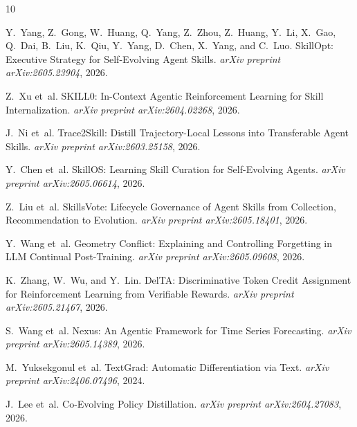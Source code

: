 \documentclass[11pt,a4paper]{article}
\begin{document}

\begin{thebibliography}{10}

Y.~Yang, Z.~Gong, W.~Huang, Q.~Yang, Z.~Zhou, Z.~Huang, Y.~Li, X.~Gao, Q.~Dai, B.~Liu, K.~Qiu, Y.~Yang, D.~Chen, X.~Yang, and C.~Luo.
\newblock SkillOpt: Executive Strategy for Self-Evolving Agent Skills.
\newblock \emph{arXiv preprint arXiv:2605.23904}, 2026.

Z.~Xu et~al.
\newblock SKILL0: In-Context Agentic Reinforcement Learning for Skill Internalization.
\newblock \emph{arXiv preprint arXiv:2604.02268}, 2026.

J.~Ni et~al.
\newblock Trace2Skill: Distill Trajectory-Local Lessons into Transferable Agent Skills.
\newblock \emph{arXiv preprint arXiv:2603.25158}, 2026.

Y.~Chen et~al.
\newblock SkillOS: Learning Skill Curation for Self-Evolving Agents.
\newblock \emph{arXiv preprint arXiv:2605.06614}, 2026.

Z.~Liu et~al.
\newblock SkillsVote: Lifecycle Governance of Agent Skills from Collection, Recommendation to Evolution.
\newblock \emph{arXiv preprint arXiv:2605.18401}, 2026.

Y.~Wang et~al.
\newblock Geometry Conflict: Explaining and Controlling Forgetting in LLM Continual Post-Training.
\newblock \emph{arXiv preprint arXiv:2605.09608}, 2026.

K.~Zhang, W.~Wu, and Y.~Lin.
\newblock DelTA: Discriminative Token Credit Assignment for Reinforcement Learning from Verifiable Rewards.
\newblock \emph{arXiv preprint arXiv:2605.21467}, 2026.

S.~Wang et~al.
\newblock Nexus: An Agentic Framework for Time Series Forecasting.
\newblock \emph{arXiv preprint arXiv:2605.14389}, 2026.

M.~Yuksekgonul et~al.
\newblock TextGrad: Automatic Differentiation via Text.
\newblock \emph{arXiv preprint arXiv:2406.07496}, 2024.

J.~Lee et~al.
\newblock Co-Evolving Policy Distillation.
\newblock \emph{arXiv preprint arXiv:2604.27083}, 2026.

\end{thebibliography}
\end{document}
